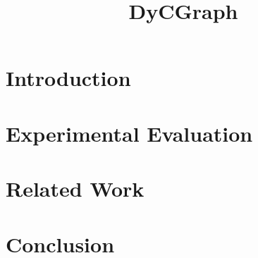 \documentclass[sigconf,nonacm]{acmart}
\title{DyCGraph}
\begin{document}
\maketitle

\section{Introduction}






\section{Experimental Evaluation}

\section{Related Work}

\section{Conclusion}
\end{document}
